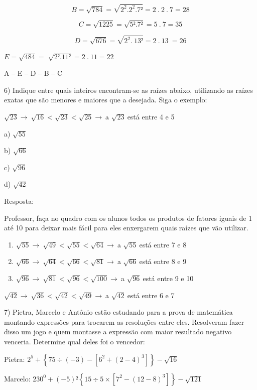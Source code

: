 \[B = \sqrt{784} = \sqrt{2^{2}.2^{2}.7²} = 2\ .\ 2\ .\ 7 = 28\]

\[C = \sqrt{1225} = \sqrt{5².7²} = 5\ .\ 7 = 35\]

\[D = \sqrt{676} = \sqrt{2^{2}.\ 13²} = 2\ .\ 13\  = 26\]

\(E = \sqrt{484} =\) \(\sqrt{2².11²} = 2\ .\ 11 = 22\)

A -- E -- D -- B -- C

6) Indique entre quais inteiros encontram-se as raízes abaixo,
utilizando as raízes exatas que são menores e maiores que a desejada.
Siga o exemplo:

\(\sqrt{23} \rightarrow \ \sqrt{16} < \sqrt{23} < \sqrt{25} \rightarrow \ \)a
\(\sqrt{23}\ \)está entre 4 e 5

a) \(\sqrt{55}\)

b) \(\sqrt{66}\)

c) \(\sqrt{96}\)

d) \(\sqrt{42}\)

Resposta:

Professor, faça no quadro com os alunos todos os produtos de fatores
iguais de 1 até 10 para deixar mais fácil para eles enxergarem quais
raízes que vão utilizar.

\begin{enumerate}
\def\labelenumi{\alph{enumi})}
\item
  \(\sqrt{55} \rightarrow \ \sqrt{49} < \sqrt{55} < \sqrt{64} \rightarrow \ \)a
  \(\sqrt{55}\ \)está entre 7 e 8
\item
  \(\sqrt{66} \rightarrow \ \sqrt{64} < \sqrt{66} < \sqrt{81} \rightarrow \ \)a
  \(\sqrt{66}\ \)está entre 8 e 9
\item
  \(\sqrt{96} \rightarrow \ \sqrt{81} < \sqrt{96} < \sqrt{100} \rightarrow \ \)a
  \(\sqrt{96}\ \)está entre 9 e 10
\end{enumerate}

\(\sqrt{42} \rightarrow \ \sqrt{36} < \sqrt{42} < \sqrt{49} \rightarrow \ \)a
\(\sqrt{42}\ \)está entre 6 e 7

7) Pietra, Marcelo e Antônio estão estudando para a prova de matemática
montando expressões para trocarem as resoluções entre eles. Resolveram
fazer disso um jogo e quem montasse a expressão com maior resultado
negativo venceria. Determine qual deles foi o vencedor:

Pietra:
\(2^{5} + \left\{ 75 \div \left( - 3 \right) - \left\lbrack 6^{2} + \left( 2 - 4 \right)^{3} \right\rbrack \right\} - \sqrt{16}\)

Marcelo:
\(230^{0} + ( - 5)²\left\{ 15 \div 5 \times \left\lbrack 7^{2} - \left( 12 - 8 \right)^{3} \right\rbrack \right\} - \sqrt{121}\)

